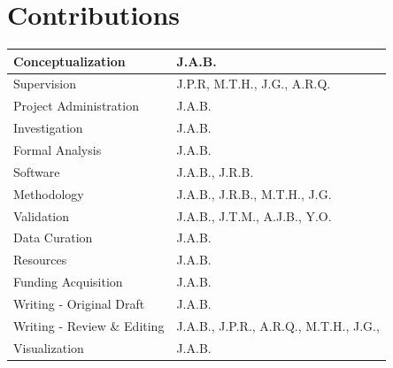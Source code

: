 \documentclass[11pt, a4paper, oneside]{article}
\begin{document}
\section*{Contributions}
\begin{tabular}{ l l }
 Conceptualization & J.A.B. \\
 \hline
 Supervision & J.P.R, M.T.H., J.G., A.R.Q. \\
 \hline
 Project Administration & J.A.B. \\
 \hline
 Investigation & J.A.B. \\
 \hline
 Formal Analysis & J.A.B. \\
 \hline
 Software & J.A.B., J.R.B. \\
 \hline
 Methodology & J.A.B., J.R.B., M.T.H., J.G. \\
 \hline
 Validation & J.A.B., J.T.M., A.J.B., Y.O. \\
 \hline
 Data Curation & J.A.B. \\
 \hline
 Resources & J.A.B. \\
 \hline
 Funding Acquisition & J.A.B. \\
 \hline
 Writing - Original Draft & J.A.B. \\
 \hline
 Writing - Review \& Editing & J.A.B., J.P.R., A.R.Q., M.T.H., J.G.,  \\
 \hline
 Visualization & J.A.B.
\end{tabular}




\end{document}
